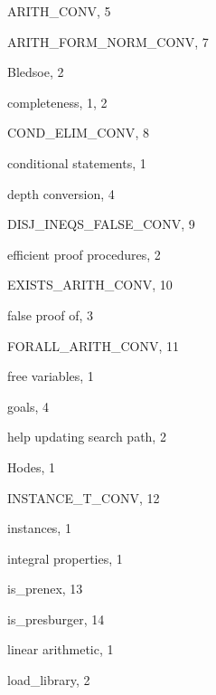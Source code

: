 \begin{theindex}

  \item {\ptt ARITH\_CONV}, 5
  \item {\ptt ARITH\_FORM\_NORM\_CONV}, 7

  \indexspace

  \item Bledsoe, 2

  \indexspace

  \item completeness, 1, 2
  \item {\ptt COND\_ELIM\_CONV}, 8
  \item conditional statements, 1

  \indexspace

  \item depth conversion, 4
  \item {\ptt DISJ\_INEQS\_FALSE\_CONV}, 9

  \indexspace

  \item efficient proof procedures, 2
  \item {\ptt EXISTS\_ARITH\_CONV}, 10

  \indexspace

  \item false
    \subitem proof of, 3
  \item {\ptt FORALL\_ARITH\_CONV}, 11
  \item free variables, 1

  \indexspace

  \item goals, 4

  \indexspace

  \item help
    \subitem updating search path, 2
  \item Hodes, 1

  \indexspace

  \item {\ptt INSTANCE\_T\_CONV}, 12
  \item instances, 1
  \item integral properties, 1
  \item {\ptt is\_prenex}, 13
  \item {\ptt is\_presburger}, 14

  \indexspace

  \item linear arithmetic, 1
  \item {\ptt load\_library}, 2


\end{theindex}
